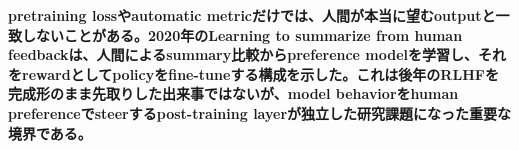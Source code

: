 \noindent\textbf{pretraining lossやautomatic metricだけでは、人間が本当に望むoutputと一致しないことがある。2020年のLearning to summarize from human feedbackは、人間によるsummary比較からpreference modelを学習し、それをrewardとしてpolicyをfine-tuneする構成を示した。これは後年のRLHFを完成形のまま先取りした出来事ではないが、model behaviorをhuman preferenceでsteerするpost-training layerが独立した研究課題になった重要な境界である。}\autocite{src-8622fc1e22c2,src-e5838d162a66}

